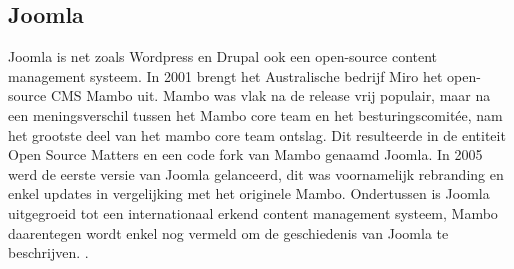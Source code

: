 \subsection{Joomla}
Joomla is net zoals Wordpress en Drupal ook een open-source content management systeem. In 2001 brengt het Australische bedrijf Miro het open-source CMS Mambo uit. Mambo was vlak na de release vrij populair, maar na een meningsverschil tussen het Mambo core team en het besturingscomitée, nam het grootste deel van het mambo core team ontslag. Dit resulteerde in de entiteit Open Source Matters en een code fork van Mambo genaamd Joomla. In 2005 werd de eerste versie van Joomla gelanceerd, dit was voornamelijk rebranding en enkel updates in vergelijking met het originele Mambo. Ondertussen is Joomla uitgegroeid tot een internationaal erkend content management systeem, Mambo daarentegen wordt enkel nog vermeld om de geschiedenis van Joomla te beschrijven.\autocite{Crowder2009} .